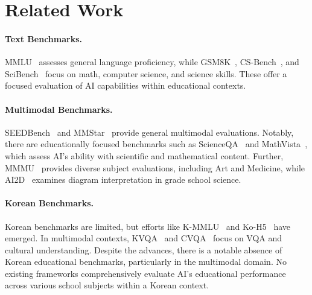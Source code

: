 \section{Related Work}
\label{sec:related_work}

\paragraph{Text Benchmarks.}

MMLU~\citep{hendrycks2021measuring} assesses general language proficiency, while GSM8K~\citep{cobbe2021gsm8k}, CS-Bench~\citep{song2024cs}, and SciBench~\citep{wang2024scibench} focus on math, computer science, and science skills. These offer a focused evaluation of AI capabilities within educational contexts.

\paragraph{Multimodal Benchmarks.}

SEEDBench~\citep{li2023seed} and MMStar~\citep{chen2024we} provide general multimodal evaluations. Notably, there are educationally focused benchmarks such as ScienceQA~\citep{lu2022learn} and MathVista~\citep{lu2024mathvista}, which assess AI’s ability with scientific and mathematical content. Further, MMMU~\citep{yue2023mmmu} provides diverse subject evaluations, including Art and Medicine, while AI2D~\citep{Kembhavi2016ADI} examines diagram interpretation in grade school science.

\paragraph{Korean Benchmarks.}
Korean benchmarks are limited, but efforts like K-MMLU~\citep{son2024kmmlumeasuringmassivemultitask} and Ko-H5~\citep{park-etal-2024-open} have emerged. In multimodal contexts, KVQA~\citep{Kim_Lim2019} and CVQA~\citep{romero2024cvqa} focus on VQA and cultural understanding.
Despite the advances, there is a notable absence of Korean educational benchmarks, particularly in the multimodal domain. No existing frameworks comprehensively evaluate AI's educational performance across various school subjects within a Korean context.